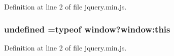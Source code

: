Definition at line 2 of file jquery.\+min.\+js.

\subsubsection[{undefined}]{\setlength{\rightskip}{0pt plus 5cm}undefined =typeof {\bf window}?window\+:this}\label{jquery_8min_8js_ae21cc36bf0d65014c717a481a3f8a468}


Definition at line 2 of file jquery.\+min.\+js.

